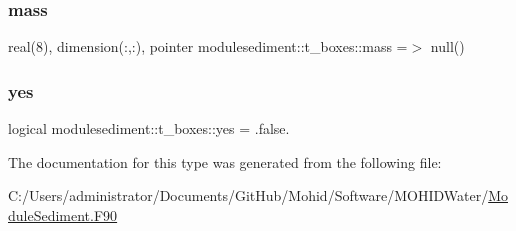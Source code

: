 \subsubsection{\texorpdfstring{mass}{mass}}
{\footnotesize\ttfamily real(8), dimension(\+:,\+:), pointer modulesediment\+::t\+\_\+boxes\+::mass =$>$ null()\hspace{0.3cm}{\ttfamily [private]}}

\mbox{\label{structmodulesediment_1_1t__boxes_a1590cac727f543b0fa5502c729c92091}} 
\subsubsection{\texorpdfstring{yes}{yes}}
{\footnotesize\ttfamily logical modulesediment\+::t\+\_\+boxes\+::yes = .false.\hspace{0.3cm}{\ttfamily [private]}}



The documentation for this type was generated from the following file\+:\begin{DoxyCompactItemize}
\item 
C\+:/\+Users/administrator/\+Documents/\+Git\+Hub/\+Mohid/\+Software/\+M\+O\+H\+I\+D\+Water/\mbox{\hyperlink{_module_sediment_8_f90}{Module\+Sediment.\+F90}}\end{DoxyCompactItemize}
